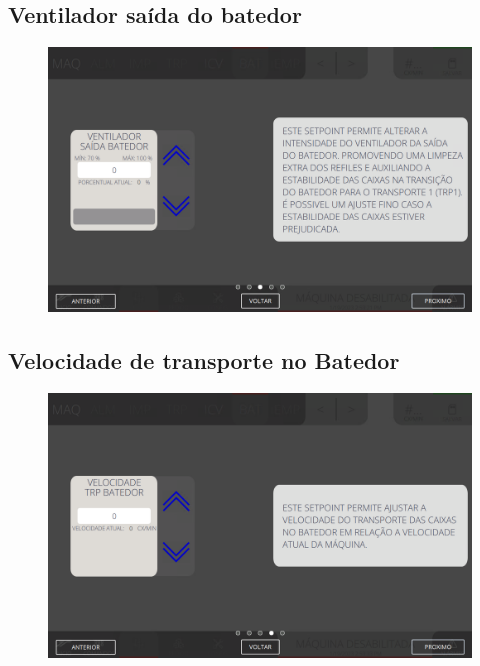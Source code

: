 \newpage
\thispagestyle{fancy}
\vspace{\fill}
\subsection{\small Ventilador saída do batedor}
\begin{figure}
    \centering
    \includegraphics[width=576 px,height=360 px]{src/imagesICV/07-scout/settings/e-3.png}
\end{figure}

\newpage
\thispagestyle{fancy}
\vspace{\fill}
\subsection{\small Velocidade de transporte no Batedor}
\begin{figure}
    \centering
    \includegraphics[width=480 px,height=300 px]{src/imagesICV/07-scout/settings/e-4.png}
\end{figure}

